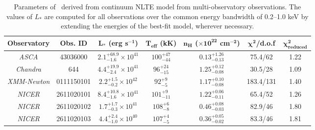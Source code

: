 	
	\begin{table}[!htb]
    	\centering
    	\caption{Parameters of \source\ derived from continuum NLTE model from multi-observatory observations. The values of $L_*$ are computed for all observations over the common energy bandwidth of 0.2--1.0 keV by extending the energies of the best-fit model, wherever necessary.}
    	\label{tab:res-fitting}
    	\begin{tabular}{ccccccc}
			\hline
			{\textbf{Observatory}} & {\textbf{Obs. ID}} & {$\boldsymbol{L_*}$ \textbf{(erg s$\boldsymbol{^{-1}}$)}} & {\textbf{$\boldsymbol{T_\text{eff}}$ (kK)}} & {\textbf{$\boldsymbol{n_H}$ ($\boldsymbol{\times 10^{22}}$ cm$\boldsymbol{^{-2}}$)}} & {$\boldsymbol{\chi^2}$/\textbf{d.o.f}} & {$\boldsymbol{\chi^2_\text{reduced}}$} \\
			\hline
			{\textit{ASCA}} & {43036000} & {$2.1_{-1.6}^{+68.9}\times 10^{41}$} & {$100_{-44}^{+47}$} & {$0.13_{-0.13}^{+1.26}$} & {75.4/62} & {1.22} \\ %
			{\textit{Chandra}} & {644} & {$4.4_{-2.4}^{+19.9}\times 10^{41}$} & {$96_{-15}^{+24}$} & {$1.25_{-0.08}^{+0.12}$} & {30.5/28} & {1.09} \\ %
			{\textit{XMM-Newton}} & {0111150101} & {$2.2_{-0.2}^{+1.5}\times 10^{42}$} & {$92_{-5}^{+9}$} & {$1.17_{-0.08}^{+0.10}$} & {183.4/131} & {1.40} \\ %
			{\textit{NICER}} & {2611020101} & {$8.4_{-1.6}^{+10.8}\times 10^{41}$} & {$101_{-11}^{+9}$} & {$1.22_{-0.11}^{+0.06}$} & {65.4/52} & {1.26} \\ %
			{\textit{NICER}} & {2611020102} & {$1.7_{-0.3}^{+1.7}\times 10^{41}$} & {$108_{-8}^{+6}$} & {$0.46_{-0.03}^{+0.08}$} & {82.9/46} & {1.80} \\ %
			{\textit{NICER}} & {2611020103} & {$4.4_{-1.0}^{+2.4}\times 10^{40}$} & {$107_{-5}^{+4}$} & {$0.36_{-0.02}^{+0.05}$} & {83.3/46} & {1.81} \\ %
			\hline
		\end{tabular}
	\end{table}
    
